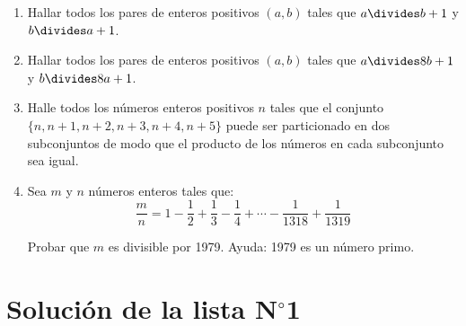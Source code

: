 \begin{enumerate}[font={\bfseries},label={\arabic*.}]
\item Hallar todos los pares de enteros positivos $(a,b)$ tales que $a\divides b+1$ y $b\divides a+1$.

\item Hallar todos los pares de enteros positivos $(a,b)$ tales que $a\divides8b+1$ y $b\divides8a+1$.

\item Halle todos los números enteros positivos $n$ tales que el conjunto $\{n,n+1,n+2,n+3,n+4,n+5\}$ puede ser particionado en dos subconjuntos de modo que el producto de los números en cada subconjunto sea igual.

\item Sea $m$ y $n$ números enteros tales que:
\[\frac{m}{n}=1-\frac{1}{2}+\frac{1}{3}-\frac{1}{4}+\cdots-\frac{1}{1318}+\frac{1}{1319}\]

Probar que $m$ es divisible por 1979. Ayuda: 1979 es un número primo.
\end{enumerate}

\section{Solución de la lista N$^{\circ}$1}


